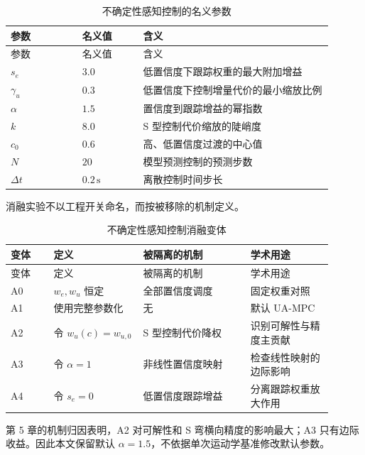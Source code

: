 \begin{longtable}{@{}>{\raggedright\arraybackslash}p{0.20\linewidth}>{\raggedright\arraybackslash}p{0.17\linewidth}>{\raggedright\arraybackslash}p{0.53\linewidth}@{}}
\caption{不确定性感知控制的名义参数}\label{tab:app-a-uampc-parameters}\\
\toprule
参数 & 名义值 & 含义 \\
\midrule
\endfirsthead
\toprule
参数 & 名义值 & 含义 \\
\midrule
\endhead
\bottomrule
\endfoot
\(s_e\) & \(3.0\) & 低置信度下跟踪权重的最大附加增益 \\
\(\gamma_u\) & \(0.3\) & 低置信度下控制增量代价的最小缩放比例 \\
\(\alpha\) & \(1.5\) & 置信度到跟踪增益的幂指数 \\
\(k\) & \(8.0\) & S 型控制代价缩放的陡峭度 \\
\(c_0\) & \(0.6\) & 高、低置信度过渡的中心值 \\
\(N\) & \(20\) & 模型预测控制的预测步数 \\
\(\Delta t\) & \(0.2\,\mathrm{s}\) & 离散控制时间步长 \\
\end{longtable}

消融实验不以工程开关命名，而按被移除的机制定义。

\begin{longtable}{@{}>{\raggedright\arraybackslash}p{0.12\linewidth}>{\raggedright\arraybackslash}p{0.25\linewidth}>{\raggedright\arraybackslash}p{0.30\linewidth}>{\raggedright\arraybackslash}p{0.23\linewidth}@{}}
\caption{不确定性感知控制消融变体}\label{tab:app-a-uampc-ablation}\\
\toprule
变体 & 定义 & 被隔离的机制 & 学术用途 \\
\midrule
\endfirsthead
\toprule
变体 & 定义 & 被隔离的机制 & 学术用途 \\
\midrule
\endhead
\bottomrule
\endfoot
A0 & \(w_e,w_u\) 恒定 & 全部置信度调度 & 固定权重对照 \\
A1 & 使用完整参数化 & 无 & 默认 UA-MPC \\
A2 & 令 \(w_u(c)=w_{u,0}\) & S 型控制代价降权 & 识别可解性与精度主贡献 \\
A3 & 令 \(\alpha=1\) & 非线性置信度映射 & 检查线性映射的边际影响 \\
A4 & 令 \(s_e=0\) & 低置信度跟踪增益 & 分离跟踪权重放大作用 \\
\end{longtable}

第 5 章的机制归因表明，A2 对可解性和 S 弯横向精度的影响最大；A3 只有边际收益。因此本文保留默认 \(\alpha=1.5\)，不依据单次运动学基准修改默认参数。

